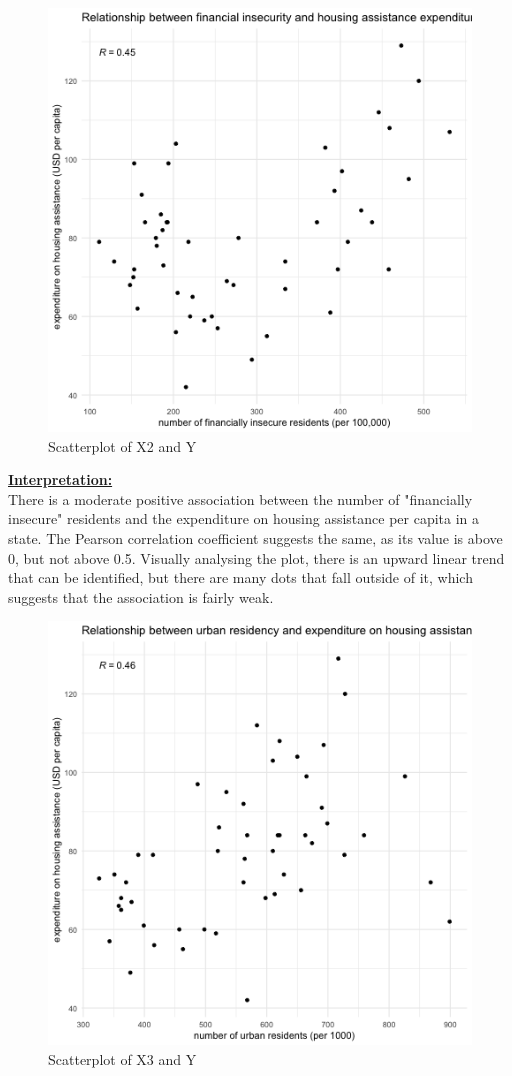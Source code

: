 \documentclass[12pt,letterpaper]{article}
\begin{document}
\begin{figure}[h!]\centering
	\caption{\footnotesize Scatterplot of X2 and Y}
	\label{fig:plot_2}
	\includegraphics[width=.7\textwidth]{scatter_x2_y.png}
\end{figure}
\vspace{.5cm}
\underline{\textbf{Interpretation:}}\\[.3cm] There is a moderate positive association between the number of "financially insecure" residents and the expenditure on housing assistance per capita in a state. The Pearson correlation coefficient suggests the same, as its value is above 0, but not above 0.5. Visually analysing the plot, there is an upward linear trend that can be identified, but there are many dots that fall outside of it, which suggests that the association is fairly weak. 
\newpage
 
\vspace{.5cm}
\begin{figure}[h!]\centering
	\caption{\footnotesize Scatterplot of X3 and Y}
	\label{fig:plot_3}
	\includegraphics[width=.7\textwidth]{scatter_x3_y.png}
\end{figure}
\end{document}
